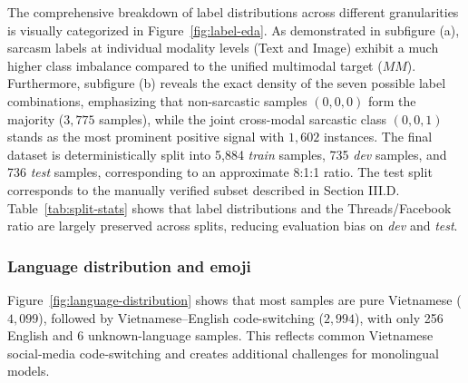 \documentclass[conference]{IEEEtran}
\begin{document}
The comprehensive breakdown of label distributions across different granularities is visually categorized in Figure~\ref{fig:label-eda}. As demonstrated in subfigure (a), sarcasm labels at individual modality levels (Text and Image) exhibit a much higher class imbalance compared to the unified multimodal target ($MM$). Furthermore, subfigure (b) reveals the exact density of the seven possible label combinations, emphasizing that non-sarcastic samples $(0,0,0)$ form the majority ($3{,}775$ samples), while the joint cross-modal sarcastic class $(0,0,1)$ stands as the most prominent positive signal with $1{,}602$ instances. The final dataset is deterministically split into 5{,}884 \textit{train} samples, 735 \textit{dev} samples, and 736 \textit{test} samples, corresponding to an approximate 8:1:1 ratio. The test split corresponds to the manually verified subset described in Section III.D. Table~\ref{tab:split-stats} shows that label distributions and the Threads/Facebook ratio are largely preserved across splits, reducing evaluation bias on \textit{dev} and \textit{test}.
\subsubsection{Language distribution and emoji}
Figure~\ref{fig:language-distribution} shows that most samples are pure Vietnamese ($4{,}099$), followed by Vietnamese--English code-switching ($2{,}994$), with only 256 English and 6 unknown-language samples. This reflects common Vietnamese social-media code-switching and creates additional challenges for monolingual models.
\end{document}

